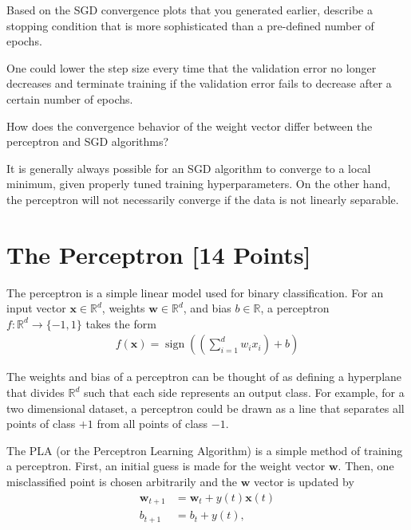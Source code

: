 \begin{problem}[2]
  Based on the SGD convergence plots that you generated earlier, describe a stopping condition that is more sophisticated than a pre-defined number of epochs.
\end{problem}
\begin{solution}
  One could lower the step size every time that the validation error no longer decreases and terminate training if the validation error fails to decrease after a certain number of epochs.
\end{solution}

\begin{problem}[2]
How does the convergence behavior of the weight vector differ between the perceptron and SGD algorithms?
\end{problem}
\begin{solution}
  It is generally always possible for an SGD algorithm to converge to a local minimum, given properly tuned training hyperparameters. On the other hand, the perceptron will not necessarily converge if the data is not linearly separable.
\end{solution}





\newpage
\section{The Perceptron [14 Points]}

The perceptron is a simple linear model used for binary classification. For an input vector $\mathbf{x} \in \mathbb{R}^d$, weights $\mathbf{w} \in \mathbb{R}^d$, and bias $b \in \mathbb{R}$, a perceptron $f: \mathbb{R}^d \rightarrow \{-1,1\}$ takes the form
\begin{align*}
  f(\mathbf{x}) = \operatorname{sign}\left(\left(\sum_{i=1}^d w_i x_i\right) + b \right)
\end{align*}

The weights and bias of a perceptron can be thought of as defining a hyperplane that divides $\mathbb{R}^d$ such that each side represents an output class. For example, for a two dimensional dataset, a perceptron could be drawn as a line that separates all points of class $+1$ from all points of class $-1$.

The PLA (or the Perceptron Learning Algorithm) is a simple method of training a perceptron. First, an initial guess is made for the weight vector $\mathbf{w}$. Then, one misclassified point is chosen arbitrarily and the $\mathbf{w}$ vector is updated by
\begin{align*}
  \mathbf{w}_{t+1} &= \mathbf{w}_t + y(t)\mathbf{x}(t) \\
  b_{t + 1} &= b_t + y(t),
\end{align*}

